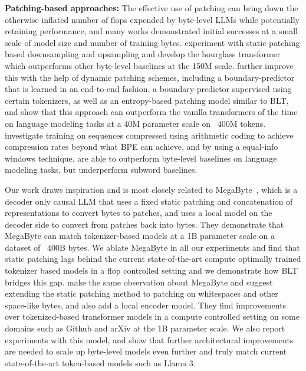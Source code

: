 \textbf{Patching-based approaches:} The effective use of patching can bring down the otherwise inflated number of flops expended by byte-level LLMs while potentially retaining performance, and many works demonstrated initial successes at a small scale of model size and number of training bytes. \cite{nawrot-etal-2022-hierarchical} experiment with static patching based downsampling and upsampling and develop the hourglass transformer which outperforms other byte-level baselines at the 150M scale. \cite{nawrot-etal-2023-efficient} further improve this with the help of dynamic patching schemes, including a boundary-predictor that is learned in an end-to-end fashion, a boundary-predictor supervised using certain tokenizers, as well as an entropy-based patching model similar to {\textsc BLT}, and show that this approach can outperform the vanilla transformers of the time on language modeling tasks at a 40M parameter scale on ~400M tokens. \cite{lester2024training} investigate training on sequences compressed using arithmetic coding to achieve compression rates beyond what BPE can achieve, and by using a equal-info windows technique, are able to outperform byte-level baselines on language modeling tasks, but underperform subword baselines.

Our work draws inspiration and is most closely related to MegaByte~\citep{yu2023megabyte}, which is a decoder only causal LLM that uses a fixed static patching and concatenation of representations to convert bytes to patches, and uses a local model on the decoder side to convert from patches back into bytes. They demonstrate that MegaByte can match tokenizer-based models at a 1B parameter scale on a dataset of ~400B bytes. We ablate MegaByte in all our experiments and find that static patching lags behind the current state-of-the-art compute optimally trained tokenizer based models in a flop controlled setting and we demonstrate how {\textsc BLT} bridges this gap. \cite{slagle2024spacebyte} make the same observation about MegaByte and suggest extending the static patching method to patching on whitespaces and other space-like bytes, and also add a local encoder model. They find improvements over tokenized-based transformer models in a compute controlled setting on some domains such as Github and arXiv at the 1B parameter scale. We also report experiments with this model, and show that further architectural improvements are needed to scale up byte-level models even further and truly match current state-of-the-art token-based models such as Llama 3.

